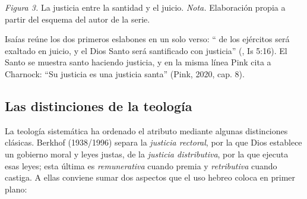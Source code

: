 \begin{center}
\par
{\footnotesize\color{gris}\textit{Figura 3.} La justicia entre la santidad y el juicio. \textit{Nota.} Elaboración propia a partir del esquema del autor de la serie.}
\end{center}

Isaías reúne los dos primeros eslabones en un solo verso: ``\SENOR{} de los ejércitos será exaltado en juicio, y el Dios Santo será santificado con justicia'' (, Is 5:16). El Santo se muestra santo haciendo justicia, y en la misma línea Pink cita a Charnock: ``Su justicia es una justicia santa'' (Pink, 2020, cap. 8).

\subsection{Las distinciones de la teología}
La teología sistemática ha ordenado el atributo mediante algunas distinciones clásicas. Berkhof (1938/1996) separa la \emph{justicia rectoral}, por la que Dios establece un gobierno moral y leyes justas, de la \emph{justicia distributiva}, por la que ejecuta esas leyes; esta última es \emph{remunerativa} cuando premia y \emph{retributiva} cuando castiga. A ellas conviene sumar dos aspectos que el uso hebreo coloca en primer plano:

